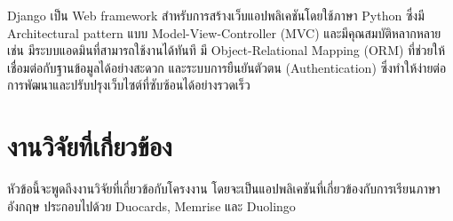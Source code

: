 \documentclass[12pt,oneside,openright,a4paper]{cpe-thai-project}
\begin{document}
\hspace{1cm}
Django \cite{Django} เป็น Web framework สำหรับการสร้างเว็บแอปพลิเคชันโดยใช้ภาษา Python ซึ่งมี Architectural pattern
แบบ Model-View-Controller (MVC) และมีคุณสมบัติหลากหลาย เช่น มีระบบแอดมินที่สามารถใช้งานได้ทันที
มี Object-Relational Mapping (ORM) ที่ช่วยให้เชื่อมต่อกับฐานข้อมูลได้อย่างสะดวก และระบบการยืนยันตัวตน (Authentication)
ซึ่งทำให้ง่ายต่อการพัฒนาและปรับปรุงเว็บไซต์ที่ซับซ้อนได้อย่างรวดเร็ว



\pagebreak
\section{งานวิจัยที่เกี่ยวข้อง}

\hspace{1cm}
หัวข้อนี้จะพูดถึงงานวิจัยที่เกี่ยวข้อกับโครงงาน โดยจะเป็นแอปพลิเคชันที่เกี่ยวข้องกับการเรียนภาษาอังกฤษ
ประกอบไปด้วย Duocards, Memrise และ Duolingo
\end{document}
